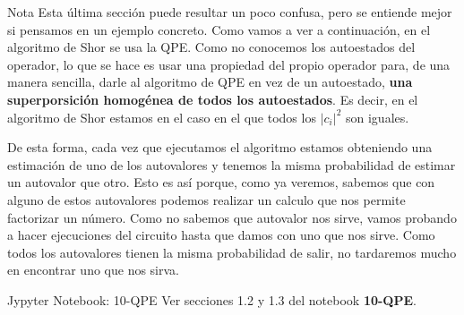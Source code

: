 \documentclass[a4paper,11pt]{book} %
\numberwithin{equation}{chapter}
\begin{document}
	\begin{mybox_blue}{Nota}
	Esta última sección puede resultar un poco confusa, pero se entiende mejor si pensamos en un ejemplo concreto. Como vamos a ver a continuación, en el algoritmo de Shor se usa la QPE. Como no conocemos los autoestados del operador, lo que se hace es usar una propiedad del propio operador para, de una manera sencilla, darle al algoritmo de QPE en vez de un autoestado, \textbf{una superporsición homogénea de todos los autoestados}. Es decir, en el algoritmo de Shor estamos en el caso en el que todos los $|c_i|^2$ son iguales. 
	\vspace{0.3cm}
	
	De esta forma, cada vez que ejecutamos el algoritmo estamos obteniendo una estimación de uno de los autovalores y tenemos la misma probabilidad de estimar un autovalor que otro. Esto es así porque, como ya veremos, sabemos que con alguno de estos autovalores podemos realizar un calculo que nos permite factorizar un número. Como no sabemos que autovalor nos sirve, vamos probando a hacer ejecuciones del circuito hasta que damos con uno que nos sirve. Como todos los autovalores tienen la misma probabilidad de salir, no tardaremos mucho en encontrar uno que nos sirva.
	\end{mybox_blue}

	
	\begin{mybox_orange}{Jypyter Notebook: 10-QPE}
	Ver secciones 1.2 y 1.3 del notebook \textbf{10-QPE}.
	\end{mybox_orange}









 



 
\end{document}
